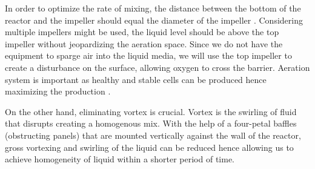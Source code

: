 In order to optimize the rate of mixing, the distance between the bottom of the reactor and the impeller should equal the diameter of the impeller \cite{Doran2012}. Considering multiple impellers might be used, the liquid level should be above the top impeller without jeopardizing the aeration space. Since we do not have the equipment to sparge air into the liquid media, we will use the top impeller to create a disturbance on the surface, allowing oxygen to cross the barrier. Aeration system is important as healthy and stable cells can be produced hence maximizing the production \cite[p.245]{LvovichVadimF2012Is}.

On the other hand, eliminating vortex is crucial. Vortex is the swirling of fluid that disrupts creating a homogenous mix. With the help of a four-petal baffles (obstructing panels) that are mounted vertically against the wall of the reactor, gross vortexing and swirling of the liquid can be reduced hence allowing us to achieve homogeneity of liquid within a shorter period of time.